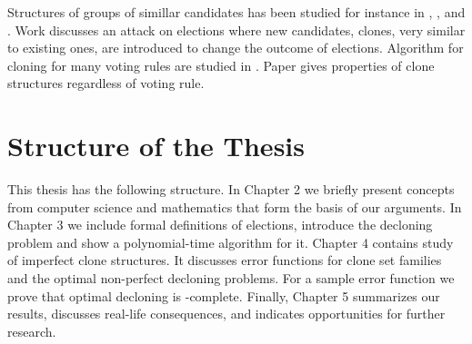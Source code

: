 Structures of groups of simillar candidates has been studied for instance in \cite{clones1}, \cite{clones2}, and \cite{clones3}.
Work \cite{independenceofclones} discusses an attack on elections where new candidates,
clones, very similar to existing ones, are introduced to change the outcome of elections.
Algorithm for cloning for many voting rules are studied in \cite{cloninginelections}.
Paper \cite{clonestructures} gives properties of clone structures regardless of voting rule.


\section{Structure of the Thesis}

This thesis has the following structure.
In Chapter 2 we briefly present concepts from computer science
and mathematics that form the basis of our arguments.
In Chapter 3 we include formal definitions of elections, introduce the decloning problem
and show a polynomial-time algorithm for it.
Chapter 4 contains study of imperfect clone structures.
It discusses error functions for clone set families and the optimal non-perfect decloning problems.
For a sample error function we prove that optimal decloning is \np-complete.
Finally, Chapter 5 summarizes our results, discusses real-life consequences,
and indicates opportunities for further research.
